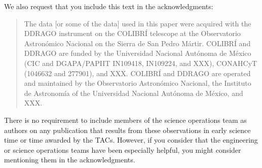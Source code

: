 We also request that you include this text in the acknowledgments:

\begin{quote}
The data [or some of the data] used in this paper were acquired with the DDRAGO instrument on the COLIBRÍ telescope at the Observatorio Astronómico Nacional on the Sierra de San Pedro Mártir. COLIBRÍ and DDRAGO are funded by the Universidad Nacional Autónoma de México (CIC and DGAPA/PAPIIT IN109418, IN109224, and XXX), CONAHCyT (1046632 and 277901), and XXX. COLIBRÍ and DDRAGO are operated and maintained by the Observatorio Astronómico Nacional, the Instituto de Astronomía of the Universidad Nacional Autónoma de México, and XXX.
\end{quote}

There is no requirement to include members of the science operations team as authors on any publication that results from these observations in early science time or time awarded by the TACs. However, if you consider that the engineering or science operations teams have been especially helpful, you might consider mentioning them in the acknowledgments.

